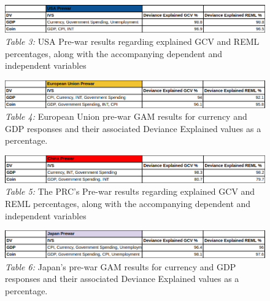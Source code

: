 \documentclass[11pt,regno]{amsart}
\theoremstyle{plain}
\numberwithin{equation}{section}
\begin{document}

\begin{figure}[h!]  
\caption*{\textit{Table 3:} USA Pre-war results regarding explained GCV and REML percentages, along with the accompanying dependent and independent variables}
\includegraphics[width=6in]{usa_prewar_gam_summary.png}
\end{figure}

\begin{figure}[h!]  
\caption*{\textit{Table 4:} European Union pre-war GAM results for currency and GDP responses and their associated Deviance Explained values as a percentage.}
\includegraphics[width=6in]{eu_prewar_gam_summary.png}
\end{figure}

\begin{figure}[h!]  
\caption*{\textit{Table 5:} The PRC's Pre-war results regarding explained GCV and REML percentages, along with the accompanying dependent and independent variables}
\includegraphics[width=6in]{china_prewar_gam_summary.png}
\end{figure}


\begin{figure}[h!]  
\caption*{\textit{Table 6:} Japan's pre-war GAM results for currency and GDP responses and their associated Deviance Explained values as a percentage.}
\includegraphics[width=6in]{japan_prewar_gam_summary.png}
\end{figure}


\ 
\end{document}
